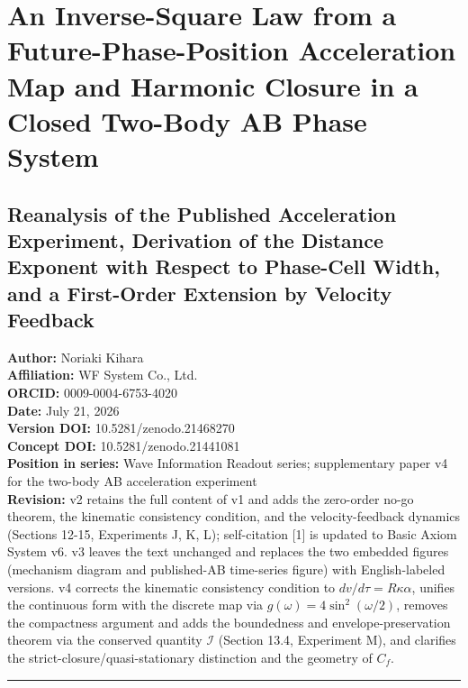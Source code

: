 \documentclass[
  a4paper,
]{article}
\author{}
\date{}
\begin{document}
\section{An Inverse-Square Law from a Future-Phase-Position Acceleration
Map and Harmonic Closure in a Closed Two-Body AB Phase
System}\label{an-inverse-square-law-from-a-future-phase-position-acceleration-map-and-harmonic-closure-in-a-closed-two-body-ab-phase-system}

\subsection{Reanalysis of the Published Acceleration Experiment,
Derivation of the Distance Exponent with Respect to Phase-Cell Width,
and a First-Order Extension by Velocity
Feedback}\label{reanalysis-of-the-published-acceleration-experiment-derivation-of-the-distance-exponent-with-respect-to-phase-cell-width-and-a-first-order-extension-by-velocity-feedback}

\textbf{Author:} Noriaki Kihara\\
\textbf{Affiliation:} WF System Co., Ltd.\\
\textbf{ORCID:} 0009-0004-6753-4020\\
\textbf{Date:} July 21, 2026\\
\textbf{Version DOI:} 10.5281/zenodo.21468270\\
\textbf{Concept DOI:} 10.5281/zenodo.21441081\\
\textbf{Position in series:} Wave Information Readout series;
supplementary paper v4 for the two-body AB acceleration experiment\\
\textbf{Revision:} v2 retains the full content of v1 and adds the
zero-order no-go theorem, the kinematic consistency condition, and the
velocity-feedback dynamics (Sections 12-15, Experiments J, K, L);
self-citation {[}1{]} is updated to Basic Axiom System v6. v3 leaves the
text unchanged and replaces the two embedded figures (mechanism diagram
and published-AB time-series figure) with English-labeled versions. v4
corrects the kinematic consistency condition to
\(dv/d\tau=R\kappa\alpha\), unifies the continuous form with the
discrete map via \(g(\omega)=4\sin^2(\omega/2)\), removes the
compactness argument and adds the boundedness and envelope-preservation
theorem via the conserved quantity \(\mathcal I\) (Section 13.4,
Experiment M), and clarifies the strict-closure/quasi-stationary
distinction and the geometry of \(C_f\).

\begin{center}\rule{0.5\linewidth}{0.5pt}\end{center}
\end{document}
